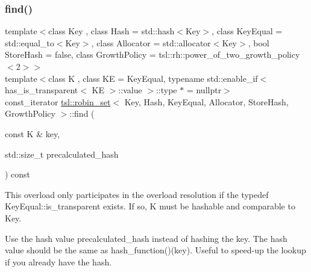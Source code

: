 \subsubsection{\texorpdfstring{find()}{find()}\hspace{0.1cm}{\footnotesize\ttfamily [6/6]}}
{\footnotesize\ttfamily template$<$class Key , class Hash  = std\+::hash$<$\+Key$>$, class Key\+Equal  = std\+::equal\+\_\+to$<$\+Key$>$, class Allocator  = std\+::allocator$<$\+Key$>$, bool Store\+Hash = false, class Growth\+Policy  = tsl\+::rh\+::power\+\_\+of\+\_\+two\+\_\+growth\+\_\+policy$<$2$>$$>$ \\
template$<$class K , class KE  = Key\+Equal, typename std\+::enable\+\_\+if$<$ has\+\_\+is\+\_\+transparent$<$ K\+E $>$\+::value $>$\+::type $\ast$  = nullptr$>$ \\
const\+\_\+iterator \mbox{\hyperlink{classtsl_1_1robin__set}{tsl\+::robin\+\_\+set}}$<$ Key, Hash, Key\+Equal, Allocator, Store\+Hash, Growth\+Policy $>$\+::find (\begin{DoxyParamCaption}\item[{const K \&}]{key,  }\item[{std\+::size\+\_\+t}]{precalculated\+\_\+hash }\end{DoxyParamCaption}) const\hspace{0.3cm}{\ttfamily [inline]}}





This overload only participates in the overload resolution if the typedef Key\+Equal\+::is\+\_\+transparent exists. If so, K must be hashable and comparable to Key.

Use the hash value \textquotesingle{}precalculated\+\_\+hash\textquotesingle{} instead of hashing the key. The hash value should be the same as hash\+\_\+function()(key). Useful to speed-\/up the lookup if you already have the hash. \mbox{\label{classtsl_1_1robin__set_a8a57104ad0c718dcf4a3d94fb94e8cb1}} 

